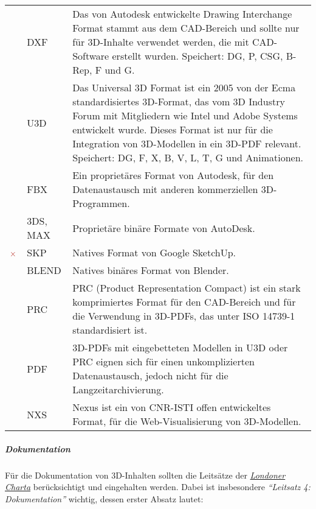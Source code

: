 \begin{center}
\begin{longtable}{l L{0.2\textwidth} p{0.6\textwidth}}
		  & DXF & Das von Autodesk entwickelte Drawing Interchange Format stammt aus dem CAD-Bereich und sollte nur für 3D-Inhalte verwendet werden, die mit CAD-Software erstellt wurden. Speichert: DG, P, CSG, B-Rep, F und G.\\
		\cmidrule(r){1-3}
		& U3D & Das Universal 3D Format ist ein 2005 von der Ecma standardisiertes 3D-Format, das vom 3D Industry Forum mit Mitgliedern wie Intel und Adobe Systems entwickelt wurde. Dieses Format ist nur für die Integration von 3D-Modellen in ein 3D-PDF relevant. Speichert: DG, F, X, B, V, L, T, G und Animationen.\\ 
		 & FBX & Ein proprietäres Format von Autodesk, für den Datenaustausch mit anderen kommerziellen 3D-Programmen.\\
		 & 3DS, MAX  & Proprietäre binäre Formate von AutoDesk.\\
		 & SKP & Natives Format von Google SketchUp.\\
		 & BLEND & Natives binäres Format von Blender.\\
		 & PRC & PRC (Product Representation Compact) ist ein stark komprimiertes Format für den CAD-Bereich und für die Verwendung in 3D-PDFs, das unter ISO 14739-1 standardisiert ist.\\
		 & PDF & 3D-PDFs mit eingebetteten Modellen in U3D oder PRC eignen sich für einen unkomplizierten Datenaustausch, jedoch nicht für die Langzeitarchivierung. \\
		 & NXS & Nexus ist ein von CNR-ISTI offen entwickeltes Format, für die Web-Visualisierung von 3D-Modellen.\\
		\bottomrule    
	\end{longtable}
\end{center}




\subparagraph{Dokumentation} Für die Dokumentation von 3D-Inhalten sollten die Leitsätze der \emph{\href{www.londoncharter.org}{Londoner Charta}} berücksichtigt und eingehalten werden. Dabei ist insbesondere \emph{"`Leitsatz 4: Dokumentation"'} wichtig, dessen erster Absatz lautet:  

